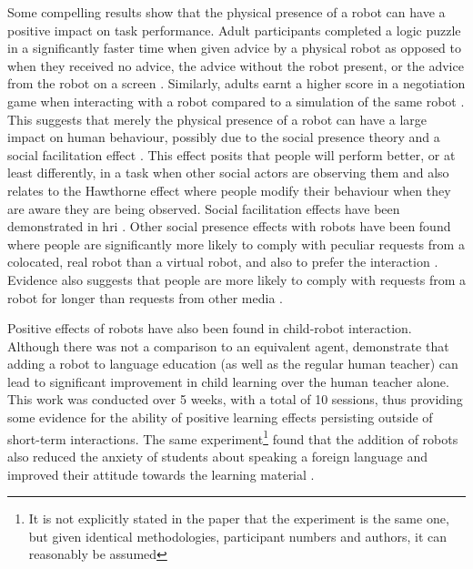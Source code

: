 Some compelling results show that the physical presence of a robot can have a positive impact on task performance. Adult participants completed a logic puzzle in a significantly faster time when given advice by a physical robot as opposed to when they received no advice, the advice without the robot present, or the advice from the robot on a screen \citep{leyzberg2012physical}. Similarly, adults earnt a higher score in a negotiation game when interacting with a robot compared to a simulation of the same robot \citep{bartneck2003interacting}. This suggests that merely the physical presence of a robot can have a large impact on human behaviour, possibly due to the social presence theory \citep{biocca2003toward} and a social facilitation effect \citep{triplett1898dynamogenic,zajonc1965social}. This effect posits that people will perform better, or at least differently, in a task when other social actors are observing them \citep{uziel2007individual} and also relates to the Hawthorne effect \citep{landsberger1958hawthorne} where people modify their behaviour when they are aware they are being observed. Social facilitation effects have been demonstrated in \acrshort{hri} \citep{riether2012social}. Other social presence effects with robots have been found where people are significantly more likely to comply with peculiar requests from a colocated, real robot than a virtual robot, and also to prefer the interaction \citep{bainbridge2008effect,bainbridge2011benefits}. Evidence also suggests that people are more likely to comply with requests from a robot for longer than requests from other media \citep{kidd2008designing}.

Positive effects of robots have also been found in child-robot interaction. Although there was not a comparison to an equivalent agent, \cite{alemi2014employing} demonstrate that adding a robot to language education (as well as the regular human teacher) can lead to significant improvement in child learning over the human teacher alone. This work was conducted over 5 weeks, with a total of 10 sessions, thus providing some evidence for the ability of positive learning effects persisting outside of short-term interactions. The same experiment\footnote{It is not explicitly stated in the paper that the experiment is the same one, but given identical methodologies, participant numbers and authors, it can reasonably be assumed} found that the addition of robots also reduced the anxiety of students about speaking a foreign language and improved their attitude towards the learning material \citep{alemi2015impact}.

